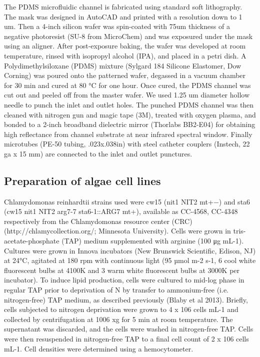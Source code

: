 \documentclass[aps,pra,reprint,superscriptaddress]{revtex4-1}
\begin{document}
The PDMS microfluidic channel is fabricated using standard soft lithography. The mask was designed in AutoCAD and printed with a resolution down to 1 um. Then a 4-inch silicon wafer was spin-coated with 75um thickness of a negative photoresist (SU-8 from MicroChem) and was exposured under the mask using an aligner. After post-exposure baking, the wafer was developed at room temperature, rinsed with isopropyl alcohol (IPA), and placed in a petri dish.  A Polydimethylsiloxane (PDMS) mixture (Sylgard 184 Silicone Elastomer, Dow Corning) was poured onto the patterned wafer, degassed in a vacuum chamber for 30 min and cured at 80 °C for one hour. Once cured, the PDMS channel was cut out and peeled off from the master wafer. We used 1.25 um diameter hollow needle to punch the inlet and outlet holes. 
The punched PDMS channel was then cleaned with nitrogen gun and magic tape (3M), treated with oxygen plasma, and bonded to a 2-inch broadband dielectric mirror (Thorlabs BB2-E04) for obtaining high reflectance from channel substrate at near infrared spectral window. Finally microtubes (PE-50 tubing, .023x.038in) with steel catheter couplers (Instech, 22 ga x 15 mm) are connected to the inlet and outlet punctures.

\subsection{Preparation of algae cell lines}

Chlamydomonas reinhardtii strains used were cw15 (nit1 NIT2 mt+−) and sta6 (cw15 nit1 NIT2 arg7-7 sta6-1::ARG7 mt+), available as CC-4568, CC-4348 respectively from the Chlamydomonas resource center (CRC) (http://chlamycollection.org/; Minnesota University). 
Cells were grown in tris-acetate-phosphate (TAP) medium supplemented with arginine (100 μg mL-1). Cultures were grown in Innova incubators (New Brunswick Scientific, Edison, NJ) at 24°C, agitated at 180 rpm with continuous light (95 µmol m-2 s-1, 6 cool white fluorescent bulbs at 4100K and 3 warm white fluorescent bulbs at 3000K per incubator). To induce lipid production, cells were cultured to mid-log phase in regular TAP prior to deprivation of N by transfer to ammonium-free (i.e. nitrogen-free) TAP medium, as described previously (Blaby et al 2013). Briefly, cells subjected to nitrogen deprivation were grown to 4 x 106 cells mL-1 and collected by centrifugation at 1006 xg for 5 min at room temperature. The supernatant was discarded, and the cells were washed in nitrogen-free TAP. Cells were then resuspended in nitrogen-free TAP to a final cell count of 2 x 106 cells mL-1. Cell densities were determined using a hemocytometer.
\end{document}
